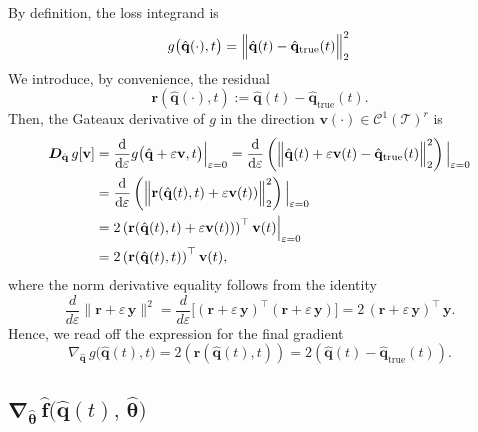 By definition, the loss integrand is\\
$$g\bigl(\hat{\mathbf{q}}(\cdot),t\bigr)= \Bigl\|\hat{\mathbf{q}}(t) - \hat{\mathbf{q}}_{\mathrm{true}}(t)\Bigr\|_2^2\,$$
We introduce, by convenience, the residual\\
$$\mathbf{r}(\hat{\mathbf{q}}(\cdot),t):=  \hat{\mathbf{q}}(t) - \hat{\mathbf{q}}_{\mathrm{true}}(t).$$
Then, the Gateaux derivative of $g$ in the direction $\mathbf{v}(\cdot)\in\mathcal{C}^1(\mathcal{T})^r$ is\\
\begin{align*}
\label{eq:gradient_3}
\bm{D}_{\hat{\mathbf{q}}}\,g[\mathbf{v}]
&=\frac{\mathrm{d}}{\mathrm{d}\varepsilon}
g\bigl(\hat{\mathbf{q}}+\varepsilon\mathbf{v},t\bigr)\Big|_{\varepsilon=0}=
\frac{\mathrm{d}}{\mathrm{d}\varepsilon}\left( \Bigl\|\hat{\mathbf{q}}(t) + \varepsilon\mathbf{v}(t) - \hat{\mathbf{q}}_{\mathrm{true}}(t)\Bigr\|_2^2\right) \Big|_{\varepsilon=0}\\
 &= \frac{\mathrm{d}}{\mathrm{d}\varepsilon}\left( \Bigl\|\mathbf{r}(\hat{\mathbf{q}}(t),t) + \varepsilon\mathbf{v}(t))\Bigr\|_2^2\right) \Big|_{\varepsilon=0}\\
 &= 2\left(\mathbf{r}(\hat{\mathbf{q}}(t),t) + \varepsilon\mathbf{v}(t))\right)^{\top}\mathbf{v}(t) \Big|_{\varepsilon=0}\\
 &= 2\left(\mathbf{r}(\hat{\mathbf{q}}(t),t)\right)^{\top}\mathbf{v}(t),
\end{align*}
where the norm derivative equality follows from the identity\\
$$\frac{d}{d\varepsilon}\|\mathbf{r} + \varepsilon\,\mathbf{y}\|^2
= \frac{d}{d\varepsilon}\bigl[(\mathbf{r} + \varepsilon\,\mathbf{y})^\top (\mathbf{r} + \varepsilon\,\mathbf{y})\bigr]= 2\,(\mathbf{r} + \varepsilon\,\mathbf{y})^\top\,\mathbf{y}.$$
Hence, we read off the expression for the final gradient\\
\begin{equation}
\label{eq:gradient_3}
\nabla_{\hat{\mathbf{q}}}\,g\bigl(\hat{\mathbf{q}}(t),t\bigr) = 2\left(\mathbf{r}(\hat{\mathbf{q}}(t),t)\right) = 2\left(\hat{\mathbf{q}}(t) - \hat{\mathbf{q}}_{\mathrm{true}}(t)\right).
\end{equation}

\subsection{$\bm{\nabla}_{\hat{\bm{\theta}}}\,\hat{\mathbf{f}}\bigl(\hat{\mathbf{q}}(t),\,\hat{\bm{\theta}}\bigr)$}

